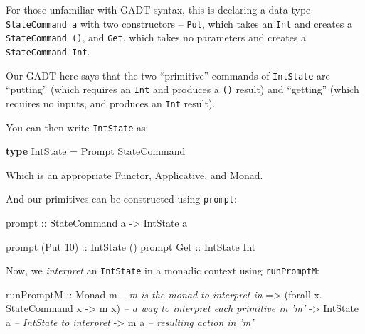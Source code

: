 \documentclass[]{article}
\newenvironment{Shaded}{}{}
\newcommand{\CommentTok}[1]{\textcolor[rgb]{0.38,0.63,0.69}{\textit{#1}}}
\newcommand{\DataTypeTok}[1]{\textcolor[rgb]{0.56,0.13,0.00}{#1}}
\newcommand{\DecValTok}[1]{\textcolor[rgb]{0.25,0.63,0.44}{#1}}
\newcommand{\FunctionTok}[1]{\textcolor[rgb]{0.02,0.16,0.49}{#1}}
\newcommand{\KeywordTok}[1]{\textcolor[rgb]{0.00,0.44,0.13}{\textbf{#1}}}
\newcommand{\NormalTok}[1]{#1}
\newcommand{\OtherTok}[1]{\textcolor[rgb]{0.00,0.44,0.13}{#1}}
\begin{document}
For those unfamiliar with GADT syntax, this is declaring a data type
\texttt{StateCommand\ a} with two constructors -- \texttt{Put}, which takes an
\texttt{Int} and creates a \texttt{StateCommand\ ()}, and \texttt{Get}, which
takes no parameters and creates a \texttt{StateCommand\ Int}.

Our GADT here says that the two ``primitive'' commands of \texttt{IntState} are
``putting'' (which requires an \texttt{Int} and produces a \texttt{()} result)
and ``getting'' (which requires no inputs, and produces an \texttt{Int} result).

You can then write \texttt{IntState} as:

\begin{Shaded}
\begin{Highlighting}[]
\KeywordTok{type} \DataTypeTok{IntState} \FunctionTok{=} \DataTypeTok{Prompt} \DataTypeTok{StateCommand}
\end{Highlighting}
\end{Shaded}

Which is an appropriate Functor, Applicative, and Monad.

And our primitives can be constructed using \texttt{prompt}:

\begin{Shaded}
\begin{Highlighting}[]
\OtherTok{prompt ::} \DataTypeTok{StateCommand}\NormalTok{ a }\OtherTok{->} \DataTypeTok{IntState}\NormalTok{ a}

\NormalTok{prompt (}\DataTypeTok{Put} \DecValTok{10}\NormalTok{)}\OtherTok{ ::} \DataTypeTok{IntState}\NormalTok{ ()}
\NormalTok{prompt }\DataTypeTok{Get}\OtherTok{      ::} \DataTypeTok{IntState} \DataTypeTok{Int}
\end{Highlighting}
\end{Shaded}

Now, we \emph{interpret} an \texttt{IntState} in a monadic context using
\texttt{runPromptM}:

\begin{Shaded}
\begin{Highlighting}[]
\NormalTok{runPromptM}
\OtherTok{    ::} \DataTypeTok{Monad}\NormalTok{ m                              }\CommentTok{-- m is the monad to interpret in}
    \OtherTok{=>}\NormalTok{ (forall x}\FunctionTok{.} \DataTypeTok{StateCommand}\NormalTok{ x }\OtherTok{->}\NormalTok{ m x)    }\CommentTok{-- a way to interpret each primitive in 'm'}
    \OtherTok{->} \DataTypeTok{IntState}\NormalTok{ a                           }\CommentTok{-- IntState to interpret}
    \OtherTok{->}\NormalTok{ m a                                  }\CommentTok{-- resulting action in 'm'}
\end{Highlighting}
\end{Shaded}
\end{document}
